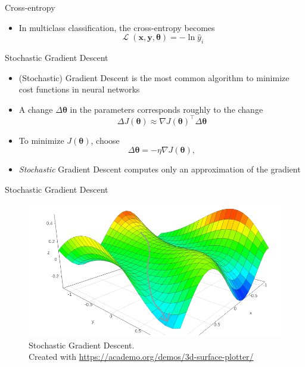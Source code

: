 \documentclass{beamer}
\DeclareMathOperator{\loss}{\mathcal{L}}
\begin{document}
	\begin{frame}{Cross-entropy}
		\begin{itemize}
			\item <1-> In multiclass classification, the cross-entropy becomes
			\begin{equation}
			\loss(\bm{x}, \bm{y}, \bm{\theta}) = -\ln \hat{y}_i
			\end{equation}
		\end{itemize}
	\end{frame}
	\begin{frame}{Stochastic Gradient Descent}
		\begin{itemize}
			\item <1-> (Stochastic) Gradient Descent is the most common algorithm to minimize cost functions in neural networks
			\item <2-> A change $\Delta \bm{\theta}$ in the parameters corresponds roughly to the change
			\begin{equation}
			\Delta J(\bm{\theta}) \approx \nabla J(\bm{\theta})^{\top}\Delta\bm{\theta}
			\end{equation}
			\item <3-> To minimize $J(\bm{\theta})$, choose
			\begin{equation}
			\Delta\bm{\theta} = -\eta\nabla J(\bm{\theta}),
			\end{equation}
			\item <4-> \emph{Stochastic} Gradient Descent computes only an approximation of the gradient
		\end{itemize}
	\end{frame}
	\begin{frame}{Stochastic Gradient Descent}
		\begin{figure}
			\begin{center}
				\includegraphics[scale=.35]{fig/gradient_descent}
			\end{center}
			\caption{Stochastic Gradient Descent. \\Created with \url{https://academo.org/demos/3d-surface-plotter/}}
		\end{figure}
	\end{frame}
\end{document}
